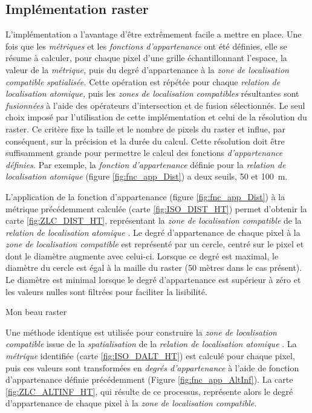 \subsection{Implémentation raster}

L'implémentation a l'avantage d'être extrêmement facile a mettre en
place. Une fois que les \emph{métriques} et les \emph{fonctions
  d’appartenance} ont été définies, elle se résume à calculer, pour
chaque pixel d'une grille échantillonnant l'espace, la valeur de la
\emph{métrique,} puis du degré d'appartenance à la \emph{zone de
  localisation compatible} \emph{spatialisée.} Cette opération est
répétée pour chaque \emph{relation de localisation atomique,} puis les
\emph{zones de localisation compatibles} résultantes sont
\emph{fusionnées} à l'aide des opérateurs d'intersection et de fusion
sélectionnés. Le seul choix imposé par l'utilisation de cette
implémentation et celui de la résolution du raster. Ce critère fixe la
taille et le nombre de pixels du raster et influe, par conséquent, sur
la précision et la durée du calcul. Cette résolution doit être
suffisamment grande pour permettre le calcul des fonctions
\emph{d'appartenance définies.} Par exemple, la \emph{fonction
  d'appartenance} définie pour la \emph{relation de localisation
  atomique}
(figure \ref{fig:fnc_app_Dist}) a deux seuils, \num{50} et
\SI{100}{\meter}.

L’application de la fonction d'appartenance (figure
\ref{fig:fnc_app_Dist}) à la métrique précédemment calculée (carte
\ref{fig:ISO_DIST_HT}) permet d'obtenir la carte
\ref{fig:ZLC_DIST_HT}, représentant la \emph{zone de localisation
  compatible} de la \emph{relation de localisation atomique}
.
Le degré d'appartenance de chaque pixel à la \emph{zone de
  localisation compatible} est représenté par un cercle, centré sur le
pixel et dont le diamètre augmente avec celui-ci. Lorsque ce degré est
maximal, le diamètre du cercle est égal à la maille du raster (50
mètres dans le cas présent). Le diamètre est minimal lorsque le degré
d'appartenance est supérieur à zéro et les valeurs nulles sont
filtrées pour faciliter la lisibilité.

\begin{carte}
  \centering
  
  \caption{Mon beau raster}
  \label{fig:ZLC_DIST_HT}
\end{carte}

Une méthode identique est utilisée pour construire la \emph{zone de
  localisation compatible} issue de la \emph{spatialisation} de la
\emph{relation de localisation atomique}
. La
\emph{métrique} identifiée (carte \ref{fig:ISO_DALT_HT}) est calculé
pour chaque pixel, puis ces valeurs sont transformées en \emph{degrés
  d'appartenance} à l'aide de fonction d'appartenance définie
précédemment (Figure \ref{fig:fnc_app_AltInf}). La carte
\ref{fig:ZLC_ALTINF_HT}, qui résulte de ce processus, représente alors
le degré d'appartenance de chaque pixel à la \emph{zone de
  localisation compatible.}

